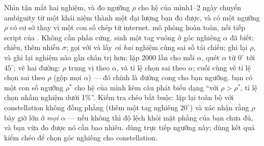 \documentclass[../../marker.tex]{subfiles}
\begin{document}
\begin{ungdung}
\end{ungdung}

\begin{duan}{Nhìn tận mắt hai nghiệm, và đo ngưỡng \(\rho\) cho hệ của mình}{1--2 ngày}
\dmt chuyển ambiguity từ một khái niệm thành một đại lượng bạn đo được, và có một ngưỡng \(\rho\) có cơ sở thay vì một con số chép từ internet.
\ddl mô phỏng hoàn toàn, nối tiếp script của . Không cần phần cứng.
\dbc sinh một tag vuông ở góc nghiêng \(\alpha\) đã biết; chiếu, thêm nhiễu \(\sigma\); gọi  với  và lấy \emph{cả hai} nghiệm cùng sai số tái chiếu; ghi lại \(\rho\), và ghi lại nghiệm nào gần chân trị hơn; lặp 2000 lần cho mỗi \(\alpha\), quét \(\alpha\) từ \(0^\circ\) tới \(45^\circ\); vẽ hai đường: \(\rho\) trung vị theo \(\alpha\), và tỉ lệ chọn sai theo \(\alpha\); cuối cùng vẽ tỉ lệ chọn sai theo \(\rho\) (gộp mọi \(\alpha\)) --- đó chính là đường cong cho bạn ngưỡng.
\dxk bạn có một con số ngưỡng \(\rho^\ast\) cho hệ của mình kèm câu phát biểu dạng ``với \(\rho > \rho^\ast\), tỉ lệ chọn nhầm nghiệm dưới 1\%''. Kiểm tra chéo bắt buộc: lặp lại toàn bộ với constellation không đồng phẳng (thêm một tag nghiêng \(20^\circ\)) và xác nhận rằng \(\rho\) bây giờ lớn ở \emph{mọi} \(\alpha\) --- nếu không thì độ lệch khỏi mặt phẳng của bạn chưa đủ, và bạn vừa đo được nó cần bao nhiêu.
\dnv {} dùng trực tiếp ngưỡng này;  dùng kết quả kiểm chéo để chọn góc nghiêng cho constellation.
\end{duan}
\end{document}
